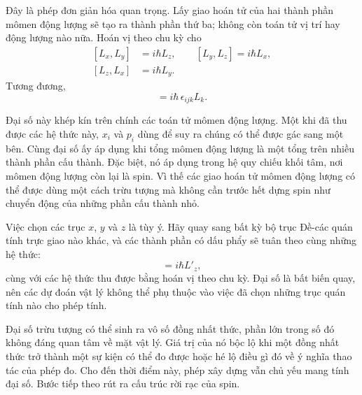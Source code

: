 Đây là phép đơn giản hóa quan trọng. Lấy giao hoán tử của hai thành phần mômen động lượng sẽ tạo ra thành phần thứ ba; không còn toán tử vị trí hay động lượng nào nữa. Hoán vị theo chu kỳ cho
\begin{equation}
\begin{aligned}
[L_x,L_y]&=i\hbar L_z,\qquad
[L_y,L_z]=i\hbar L_x,\\
[L_z,L_x]&=i\hbar L_y.
\end{aligned}
\end{equation}
Tương đương,
\begin{equation}
[L_i,L_j]=i\hbar\,\epsilon_{ijk}L_k.
\end{equation}

Đại số này khép kín trên chính các toán tử mômen động lượng. Một khi đã thu được các hệ thức này, \(x_i\) và \(p_i\) dùng để suy ra chúng có thể được gác sang một bên. Cùng đại số ấy áp dụng khi tổng mômen động lượng là một tổng trên nhiều thành phần cấu thành. Đặc biệt, nó áp dụng trong hệ quy chiếu khối tâm, nơi mômen động lượng còn lại là spin. Vì thế các giao hoán tử mômen động lượng có thể được dùng một cách trừu tượng mà không cần trước hết dựng spin như chuyển động của những phần cấu thành nhỏ.

Việc chọn các trục \(x\), \(y\) và \(z\) là tùy ý. Hãy quay sang bất kỳ bộ trục Đề-các quán tính trực giao nào khác, và các thành phần có dấu phẩy sẽ tuân theo cùng những hệ thức:
\begin{equation}
[L'_x,L'_y]=i\hbar L'_z,
\end{equation}
cùng với các hệ thức thu được bằng hoán vị theo chu kỳ. Đại số là bất biến quay, nên các dự đoán vật lý không thể phụ thuộc vào việc đã chọn những trục quán tính nào cho phép tính.

\begin{classroomqa}
\end{classroomqa}

Đại số trừu tượng có thể sinh ra vô số đồng nhất thức, phần lớn trong số đó không đáng quan tâm về mặt vật lý. Giá trị của nó bộc lộ khi một đồng nhất thức trở thành một sự kiện có thể đo được hoặc hé lộ điều gì đó về ý nghĩa thao tác của phép đo. Cho đến thời điểm này, phép xây dựng vẫn chủ yếu mang tính đại số. Bước tiếp theo rút ra cấu trúc rời rạc của spin.

